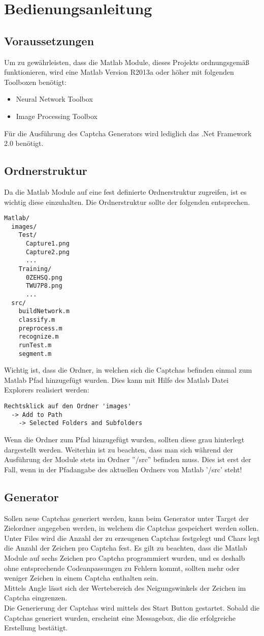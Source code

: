 \section{Bedienungsanleitung}
\subsection{Voraussetzungen}
Um zu gewährleisten, dass die Matlab Module, dieses Projekts ordnungsgemäß funktionieren, wird eine Matlab Version R2013a oder höher mit folgenden Toolboxen benötigt:
\begin{itemize}
\item Neural Network Toolbox
\item Image Processing Toolbox
\end{itemize}
Für die Ausführung des Captcha Generators wird lediglich das .Net Framework 2.0 benötigt.

\subsection{Ordnerstruktur}
Da die Matlab Module auf eine fest definierte Ordnerstruktur zugreifen, ist es wichtig diese einzuhalten. Die Ordnerstruktur sollte der folgenden entsprechen.
\begin{verbatim}
Matlab/
  images/
    Test/
      Capture1.png
      Capture2.png
      ...
    Training/
      0ZEHSQ.png
      TWU7P8.png
      ...
  src/
    buildNetwork.m
    classify.m
    preprocess.m
    recognize.m
    runTest.m
    segment.m
\end{verbatim}
Wichtig ist, dass die Ordner, in welchen sich die Captchas befinden einmal zum Matlab Pfad hinzugefügt wurden. Dies kann mit Hilfe des Matlab Datei Explorers realisiert werden:
\begin{verbatim}
Rechtsklick auf den Ordner 'images'
  -> Add to Path
    -> Selected Folders and Subfolders
\end{verbatim}
Wenn die Ordner zum Pfad hinzugefügt wurden, sollten diese grau hinterlegt dargestellt werden. Weiterhin ist zu beachten, dass man sich während der Ausführung der Module stets im Ordner ''/src'' befinden muss. Dies ist erst der Fall, wenn in der Pfadangabe des aktuellen Ordners von Matlab '/src' steht!
\subsection{Generator}
Sollen neue Captchas generiert werden, kann beim Generator unter Target der Zielordner angegeben werden, in welchem die Captchas gespeichert werden sollen. Unter Files wird die Anzahl der zu erzeugenen Captchas festgelegt und Chars legt die Anzahl der Zeichen pro Captcha fest. Es gilt zu beachten, dass die Matlab Module auf sechs Zeichen pro Captcha programmiert wurden, und es deshalb ohne entsprechende Codeanpassungen zu Fehlern kommt, sollten mehr oder weniger Zeichen in einem Captcha enthalten sein.\\
Mittels Angle lässt sich der Wertebereich des Neigungswinkels der Zeichen im Captcha eingrenzen.\\
Die Generierung der Captchas wird mittels des Start Button gestartet. Sobald die Captchas generiert wurden, erscheint eine Messagebox, die die erfolgreiche Erstellung bestätigt.

